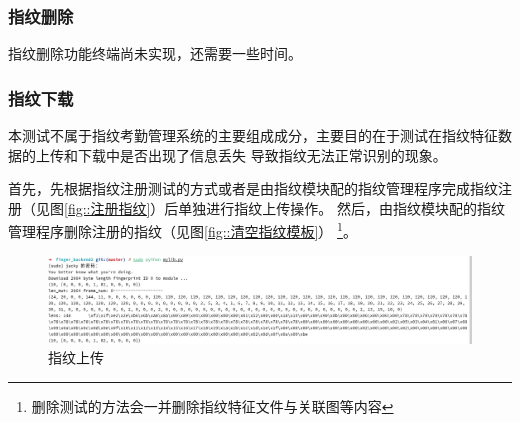     \subsubsection{指纹删除}

    指纹删除功能终端尚未实现，还需要一些时间。

    \subsubsection{指纹下载}

    本测试不属于指纹考勤管理系统的主要组成成分，主要目的在于测试在指纹特征数据的上传和下载中是否出现了信息丢失
    导致指纹无法正常识别的现象。

    首先，先根据指纹注册测试的方式或者是由指纹模块配的指纹管理程序完成指纹注册（见图\ref{fig::注册指纹}）后单独进行指纹上传操作。
    然后，由指纹模块配的指纹管理程序删除注册的指纹（见图\ref{fig::清空指纹模板}）
    \footnote{删除测试的方法会一并删除指纹特征文件与关联图等内容}。

    \begin{figure}[ht]
        \centering
        \includegraphics[width=\textwidth]{./imgs/测试-指纹上传.png}
        \caption{指纹上传}    \label{test::指纹上传}
    \end{figure}   

